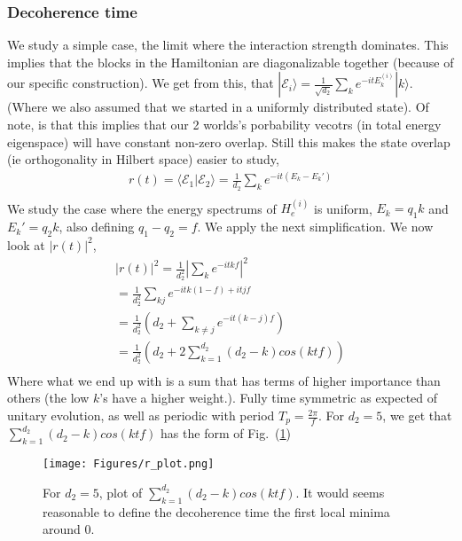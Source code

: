 \documentclass{article}
\begin{document}
\subsubsection{Decoherence time}

We study a simple case, the limit where the interaction strength dominates. This implies that the blocks in the Hamiltonian are diagonalizable together (because of our specific construction). We get from this, that $|\mathcal{E}_i\rangle=\frac{1}{\sqrt{d_2}}\sum_ke^{-itE^{(i)}_k}|k\rangle$. (Where we also assumed that we started in a uniformly distributed state). Of note, is that this implies that our 2 worlds's porbability vecotrs (in total energy eigenspace) will have constant non-zero overlap. Still this makes the state overlap (ie orthogonality in Hilbert space) easier to study,
\begin{align}
    r(t)=\langle\mathcal{E}_1|\mathcal{E}_2\rangle = \frac{1}{d_2}\sum_ke^{-it(E_k-E_k')}\\
\end{align}
We study the case where the energy spectrums of $H_e^{(i)}$ is uniform, $E_k=q_1k$ and $E_k'=q_2k$, also defining $q_1-q_2=f$. We apply the next simplification. We now look at $|r(t)|^2$,
\begin{align}
    |r(t)|^2=\frac{1}{d_2^2}|\sum_ke^{-itkf}|^2\\
    =\frac{1}{d_2^2}\sum_{kj}e^{-itk(1-f)+itjf}\\
    =\frac{1}{d_2^2}(d_2+\sum_{k\neq j}e^{-it(k-j)f})\\
    =\frac{1}{d_2^2}(d_2+2\sum^{d_2}_{k=1}(d_2-k)cos(ktf))\\
\end{align}
Where what we end up with is a sum that has terms of higher importance than others (the low $k$'s have a higher weight.). Fully time symmetric as expected of unitary evolution, as well as periodic with period $T_p=\frac{2\pi}{f}$.  
For $d_2=5$, we get that $\sum^{d_2}_{k=1}(d_2-k)cos(ktf)$ has the form of Fig.~(\ref{fig:r_plot})
\begin{figure}
    \centering
    \texttt{[image: Figures/r\_plot.png]}
    \caption{For $d_2=5$, plot of  $\sum^{d_2}_{k=1}(d_2-k)cos(ktf)$. It would seems reasonable to define the decoherence time the first local minima around 0.}
    \label{fig:r_plot}
\end{figure}
\end{document}
